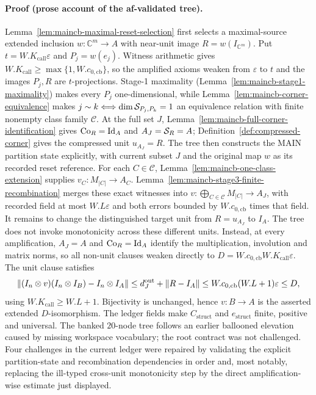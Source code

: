 \paragraph{Proof (prose account of the af-validated tree).}
Lemma~\ref{lem:maincb-maximal-reset-selection} first selects a maximal-source extended
inclusion $w:\mathbb C^m\to A$ with near-unit image $R=w(I_{\mathbb C^m})$.  Put
$t=W.K_{\mathrm{call}}\varepsilon$ and $P_j=w(e_j)$.  Witness arithmetic gives
$W.K_{\mathrm{call}}\ge\max\{1,W.c_{0,\mathrm{cb}}\}$, so the amplified axioms weaken
from $\varepsilon$ to $t$ and the images $P_j,R$ are $t$-projections.  Stage-1 maximality
(Lemma~\ref{lem:maincb-stage1-maximality}) makes every $P_j$ one-dimensional, while
Lemma~\ref{lem:maincb-corner-equivalence} makes
$j\sim k\Longleftrightarrow\dim\mathcal S_{P_j,P_k}=1$ an equivalence relation with finite
nonempty class family $\mathcal C$.
At the full set $J$, Lemma~\ref{lem:maincb-full-corner-identification} gives
$\mathrm{Co}_{R}=\mathrm{Id}_A$ and $A_J=\mathcal S_{R}=A$; Definition~\ref{def:compressed-corner} gives the
compressed unit $u_{A_J}=R$.  The tree then constructs the MAIN partition state explicitly,
with current subset $J$ and the original map $w$ as its recorded reset reference.  For each
$C\in\mathcal C$, Lemma~\ref{lem:maincb-one-class-extension} supplies
$v_C:M_{|C|}\to A_C$.  Lemma~\ref{lem:maincb-stage3-finite-recombination} merges these
exact witnesses into
$v:\bigoplus_{C\in\mathcal C}M_{|C|}\to A_J$, with recorded field at most
$W.L\varepsilon$ and both errors bounded by $W.c_{0,\mathrm{cb}}$ times that field.
It remains to change the distinguished target unit from $R=u_{A_J}$ to $I_A$.  The tree
does not invoke monotonicity across these different units.  Instead, at every amplification,
$A_J=A$ and $\mathrm{Co}_{R}=\mathrm{Id}_A$ identify the multiplication, involution and matrix norms, so all
non-unit clauses weaken directly to
$D=W.c_{0,\mathrm{cb}}W.K_{\mathrm{call}}\varepsilon$.  The unit clause satisfies
\[
 \lVert (I_n\otimes v)(I_n\otimes I_B)-I_n\otimes I_A\rVert
 \le d_J^{\mathrm{out}}+\lVert R-I_A\rVert
 \le W.c_{0,\mathrm{cb}}(W.L+1)\varepsilon\le D,
\]
using $W.K_{\mathrm{call}}\ge W.L+1$.  Bijectivity is unchanged, hence $v:B\to A$ is the
asserted extended $D$-isomorphism.  The ledger fields make
$C_{\mathrm{struct}}$ and $e_{\mathrm{struct}}$ finite, positive and universal.
The banked $20$-node tree follows an earlier ballooned elevation caused by missing workspace
vocabulary; the root contract was not challenged.  Four challenges in the current ledger
were repaired by validating the explicit partition-state and recombination dependencies in
order and, most notably, replacing the ill-typed cross-unit monotonicity step by the direct
amplification-wise estimate just displayed.
